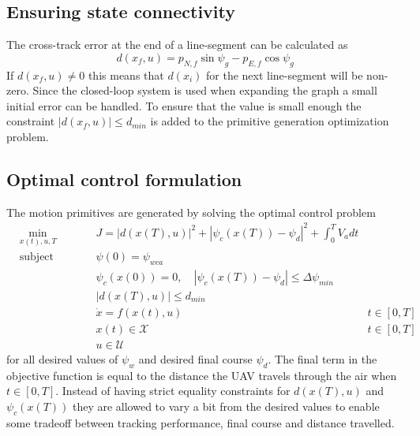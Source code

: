 \subsection{Ensuring state connectivity}
The cross-track error at the end of a line-segment can be calculated as 
\begin{equation}
    d(x_f, u) = p_{N,f}\sin\psi_g-p_{E,f}\cos\psi_g
\end{equation}
If $d(x_f, u)\neq0$ this means that $d(x_i)$ for the next line-segment will be non-zero. 
Since the closed-loop system is used when expanding the graph a small initial error can be handled.
To ensure that the value is small enough the constraint $|d(x_f, u)|\leq d_{min}$ is added to the primitive generation optimization problem.
\subsection{Optimal control formulation}
The motion primitives are generated by solving the optimal control problem
\begin{subequations}
    \label{eq:opt_problem_mp_uav}
    \begin{alignat}{3}
    &\min_{x(t),u,T}        &\qquad& J=|d(x(T), u)|^2 + |\psi_c(x(T))-\psi_d|^2 + \int_{0}^{T}V_a dt & \\
    &\text{subject to} & & \psi(0)=\psi_{wca} &\\
    & & & \psi_c(x(0))=0, \quad |\psi_c(x(T))-\psi_d| \leq \Delta\psi_{min} &\\
    & & & |d(x(T), u)|\leq d_{min} &\\
    & & & \dot{x}=f(x(t), u) &t\in[0,T]\\
    & & & x(t)\in\mathcal{X}& t\in[0,T]\\
    & & & u\in\mathcal{U} &
    \end{alignat}
\end{subequations}
for all desired values of $\psi_w$ and desired final course $\psi_d$. The final term in the objective function is equal to the distance the UAV 
travels through the air when $t\in[0, T]$. Instead of having strict equality constraints for $d(x(T), u)$ and $\psi_c(x(T))$ they 
are allowed to vary a bit from the desired values to enable some tradeoff between tracking performance, final course and distance travelled.

